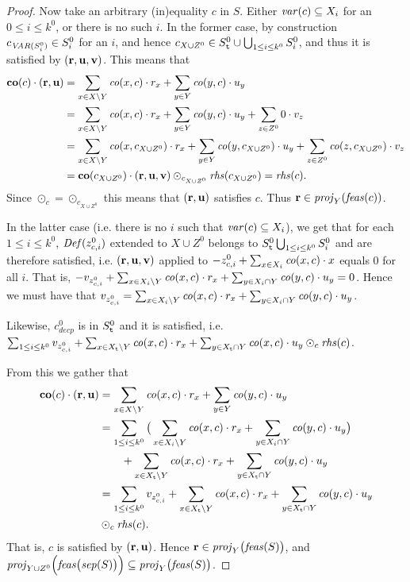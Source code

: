\begin{proof}
Now take an arbitrary (in)equality $c$ in $S$. Either $\mathit{var}(c)\subseteq X_i$ for an $0\leq i\leq k^0$, or there is no such $i$. 
In the former case, by construction $c_{\mathit{VAR}(S^0_i)}\in S^0_i$ for an $i$, and hence $c_{X\cup Z^0}\in S^0_{\texttt{t}}\cup\bigcup_{1\leq i\leq k^0}S^0_i$, and thus it is satisfied by $(\mathbf{r}, \mathbf{u}, \mathbf{v})$. This means that 
\begin{align*}
\mathbf{co}(c)\cdot (\mathbf{r},\mathbf{u}) &= \sum_{x\in X\setminus Y}\mathit{co}(x,c)\cdot r_x + \sum_{y\in Y}\mathit{co}(y,c)\cdot u_y \\
&= \sum_{x\in X\setminus Y}\mathit{co}(x,c)\cdot r_x + \sum_{y\in Y}\mathit{co}(y,c)\cdot u_y 
 + \sum_{z\in Z^0} 0 \cdot v_z\\
&= \sum_{x\in X\setminus Y}\mathit{co}(x,c_{X\cup Z^0})\cdot r_x + \sum_{y\in Y}\mathit{co}(y,c_{X\cup Z^0})\cdot u_y 
 + \sum_{z\in Z^0}\mathit{co}(z,c_{X\cup Z^0})\cdot v_z\\
&=\mathbf{co}(c_{X\cup Z^0})\cdot(\mathbf{r},\mathbf{u},\mathbf{v})\odot_{c_{X\cup Z^0}}\mathit{rhs}(c_{X\cup Z^0})=\mathit{rhs}(c).
\end{align*}
Since $\odot_c = \odot_{c_{X\cup Z^0}}$ this means that $(\mathbf{r},\mathbf{u})$ satisfies $c$. Thus $\mathbf{r} \in \mathit{proj}_Y(\mathit{feas}(c))$.

In the latter case (i.e. there is no $i$ such that $\mathit{var}(c)\subseteq X_i$), we get that for each $1\leq i\leq k^0$, $\mathit{Def}(z^0_{c,i})$ extended to $X\cup Z^0$ belongs to $S^0_{\texttt{t}}\bigcup_{1\leq i\leq k^0} S^0_i$ and are therefore satisfied, i.e. $(\mathbf{r},\mathbf{u},\mathbf{v})$ applied to $-z^0_{c,i} + \sum_{x\in X_i}\mathit{co}(x,c)\cdot x$ equals $0$ for all $i$. 
That is, 
$-v_{z^0_{c,i}} + \sum_{x\in X_i\setminus Y}\mathit{co}(x,c)\cdot r_x +\sum_{y\in X_i\cap Y}\mathit{co}(y,c)\cdot u_y = 0$. Hence we must have that $v_{z^0_{c,i}} = \sum_{x\in X_i\setminus Y}\mathit{co}(x,c)\cdot r_x +\sum_{y\in X_i\cap Y}\mathit{co}(y,c)\cdot u_y$. 

Likewise, $c^0_{decp}$ is in $S^0_{\texttt{t}}$ and it is satisfied, i.e. 
$\sum_{1\leq i\leq k^0} v_{z^0_{c,i}} + \sum_{x\in X_{\texttt{t}}\setminus Y}\mathit{co}(x,c)\cdot r_{x}+ \sum_{y\in X_{\texttt{t}}\cap Y}\mathit{co}(x,c)\cdot u_{y} \odot_c \mathit{rhs}(c)$.

From this we gather that 
\begin{align*}
\mathbf{co}(c)\cdot(\mathbf{r},\mathbf{u})&=\sum_{x\in X\setminus Y}\mathit{co}(x,c)\cdot r_x + \sum_{y\in Y}\mathit{co}(y,c)\cdot u_y \\
& = \sum_{1\leq i\leq k^0}\big(\sum_{x\in X_i\setminus Y}\mathit{co}(x,c)\cdot r_x + \sum_{y\in X_i\cap Y}\mathit{co}(y,c)\cdot u_y \big)\\
&\qquad+ \sum_{x\in X_{\texttt{t}}\setminus Y}\mathit{co}(x,c)\cdot r_x + \sum_{y\in X_{\texttt{t}}\cap Y}\mathit{co}(y,c)\cdot u_y\\
&= \sum_{1\leq i\leq k^0}v_{z^0_{c,i}}
 + \sum_{x\in X_{\texttt{t}}\setminus Y}\mathit{co}(x,c)\cdot r_x + \sum_{y\in X_{\texttt{t}}\cap Y}\mathit{co}(y,c)\cdot u_y\\
&\odot_c \mathit{rhs}(c).
\end{align*}
That is, $c$ is satisfied by $(\mathbf{r},\mathbf{u})$. 
Hence $\mathbf{r} \in \mathit{proj}_Y\big(\mathit{feas}(S)\big)$, and  $\mathit{proj}_{Y\cup Z^0}\Big(\mathit{feas}\big(\mathit{sep}(S)\big)\Big)\subseteq \mathit{proj}_{Y}\big(\mathit{feas}(S)\big)$.
\end{proof}

